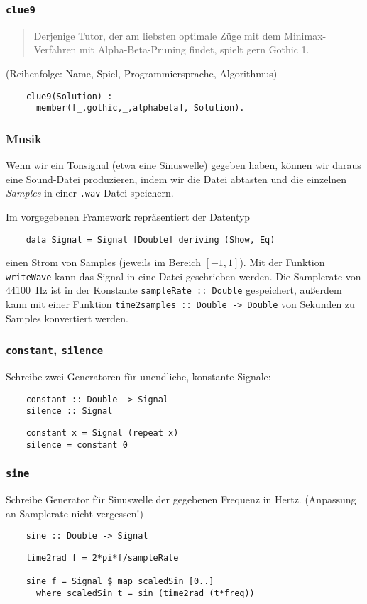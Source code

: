 \documentclass{beamer}
\begin{document}
\begin{frame}[fragile]
  \prolog
  \frametitle{\lstinline{clue9}}
  \begin{quote}
    Derjenige Tutor, der am liebsten optimale Züge mit dem Minimax-Verfahren mit Alpha-Beta-Pruning findet, spielt gern Gothic 1.
  \end{quote}
  \small{(Reihenfolge: Name, Spiel, Programmiersprache, Algorithmus)}
  \pause
  \begin{lstlisting}
    clue9(Solution) :-
      member([_,gothic,_,alphabeta], Solution).
  \end{lstlisting}
\end{frame}

\begin{frame}[fragile]
  \frametitle{Musik}
  Wenn wir ein Tonsignal (etwa eine Sinuswelle) gegeben haben,
  können wir daraus eine Sound-Datei produzieren,
  indem wir die Datei abtasten und die einzelnen \emph{Samples} in einer \texttt{.wav}-Datei speichern.
  
  Im vorgegebenen Framework repräsentiert der Datentyp
  \begin{lstlisting}
    data Signal = Signal [Double] deriving (Show, Eq)
  \end{lstlisting}
  einen Strom von Samples (jeweils im Bereich $[-1,1]$).
  Mit der Funktion \lstinline{writeWave} kann das Signal in eine Datei geschrieben werden.
  Die Samplerate von \SI{44100}{\hertz} ist in der Konstante \lstinline{sampleRate :: Double} gespeichert,
  außerdem kann mit einer Funktion \lstinline{time2samples :: Double -> Double} von Sekunden zu Samples konvertiert werden.
\end{frame}

\begin{frame}[fragile]
  \frametitle{\lstinline{constant}, \lstinline{silence}}
  Schreibe zwei Generatoren für unendliche, konstante Signale:
  \begin{lstlisting}
    constant :: Double -> Signal
    silence :: Signal
  \end{lstlisting}
  \pause
  \begin{lstlisting}
    constant x = Signal (repeat x)
    silence = constant 0
  \end{lstlisting}
\end{frame}

\begin{frame}[fragile]
  \frametitle{\lstinline{sine}}
  Schreibe Generator für Sinuswelle der gegebenen Frequenz in Hertz.
  (Anpassung an Samplerate nicht vergessen!)
  \begin{lstlisting}
    sine :: Double -> Signal
  \end{lstlisting}
  \pause
  \begin{lstlisting}
    time2rad f = 2*pi*f/sampleRate
    
    sine f = Signal $ map scaledSin [0..]
      where scaledSin t = sin (time2rad (t*freq))
  \end{lstlisting}
\end{frame}
\end{document}
